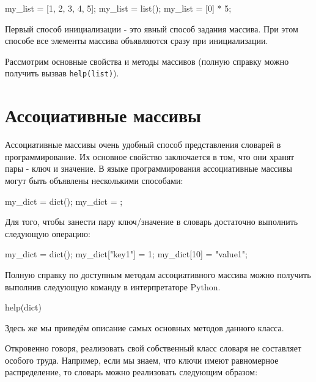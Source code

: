 \begin{python}
my_list = [1, 2, 3, 4, 5];
my_list = list();
my_list = [0] * 5;
\end{python}

Первый способ инициализации - это явный способ задания массива. При этом
способе все элементы массива объявляются сразу при инициализации.

Рассмотрим основные свойства и методы массивов (полную справку можно 
получить вызвав \texttt{help(list)}).

\section{Ассоциативные массивы}

Ассоциативные массивы очень удобный способ представления словарей
в программирование. Их основное свойство заключается в том, что 
они хранят пары - ключ и значение. В языке программирования 
ассоциативные массивы могут быть объявлены несколькими способами:

\begin{python}
my_dict = dict();
my_dict = {};
\end{python}

Для того, чтобы занести пару ключ/значение в словарь достаточно выполнить следующую
операцию:

\begin{python}
my_dict = dict();
my_dict["key1"] = 1;
my_dict[10] = "value1";
\end{python}

Полную справку по доступным методам ассоциативного массива можно получить 
выполнив следующую команду в интерпретаторе Python.

\begin{python}
help(dict)
\end{python}

Здесь же мы приведём описание самых основных методов данного класса. 

Откровенно говоря, реализовать свой собственный класс словаря не составляет
особого труда. Например, если мы знаем, что ключи имеют равномерное 
распределение, то словарь можно реализовать следующим образом:

